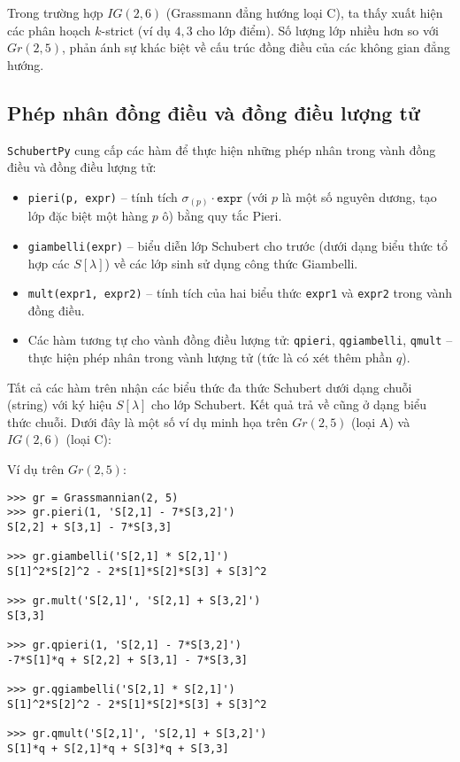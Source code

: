Trong trường hợp $IG(2,6)$ (Grassmann đẳng hướng loại C), ta thấy xuất hiện các phân hoạch $k$-strict (ví dụ $4,3$ cho lớp điểm). Số lượng lớp nhiều hơn so với $Gr(2,5)$, phản ánh sự khác biệt về cấu trúc đồng điều của các không gian đẳng hướng.

\subsection{Phép nhân đồng điều và đồng điều lượng tử}
\texttt{SchubertPy} cung cấp các hàm để thực hiện những phép nhân trong vành đồng điều và đồng điều lượng tử:
\begin{itemize}
    \item \texttt{pieri(p, expr)} – tính tích $\sigma_{(p)} \cdot \texttt{expr}$ (với $p$ là một số nguyên dương, tạo lớp đặc biệt một hàng $p$ ô) bằng quy tắc Pieri.
    \item \texttt{giambelli(expr)} – biểu diễn lớp Schubert cho trước (dưới dạng biểu thức tổ hợp các $S[\lambda]$) về các lớp sinh sử dụng công thức Giambelli.
    \item \texttt{mult(expr1, expr2)} – tính tích của hai biểu thức \texttt{expr1} và \texttt{expr2} trong vành đồng điều.
    \item Các hàm tương tự cho vành đồng điều lượng tử: \texttt{qpieri}, \texttt{qgiambelli}, \texttt{qmult} – thực hiện phép nhân trong vành lượng tử (tức là có xét thêm phần $q$).
\end{itemize}

Tất cả các hàm trên nhận các biểu thức đa thức Schubert dưới dạng chuỗi (string) với ký hiệu $S[\lambda]$ cho lớp Schubert. Kết quả trả về cũng ở dạng biểu thức chuỗi. Dưới đây là một số ví dụ minh họa trên $Gr(2,5)$ (loại A) và $IG(2,6)$ (loại C):

Ví dụ trên $Gr(2,5)$:
\small
\begin{verbatim}
>>> gr = Grassmannian(2, 5)
>>> gr.pieri(1, 'S[2,1] - 7*S[3,2]')
S[2,2] + S[3,1] - 7*S[3,3]

>>> gr.giambelli('S[2,1] * S[2,1]')
S[1]^2*S[2]^2 - 2*S[1]*S[2]*S[3] + S[3]^2

>>> gr.mult('S[2,1]', 'S[2,1] + S[3,2]')
S[3,3]

>>> gr.qpieri(1, 'S[2,1] - 7*S[3,2]')
-7*S[1]*q + S[2,2] + S[3,1] - 7*S[3,3]

>>> gr.qgiambelli('S[2,1] * S[2,1]')
S[1]^2*S[2]^2 - 2*S[1]*S[2]*S[3] + S[3]^2

>>> gr.qmult('S[2,1]', 'S[2,1] + S[3,2]')
S[1]*q + S[2,1]*q + S[3]*q + S[3,3]
\end{verbatim}
\normalsize

